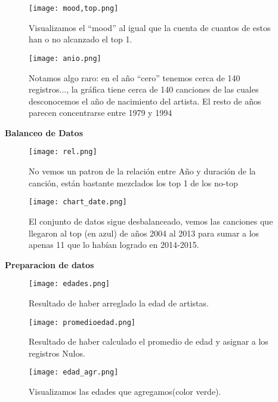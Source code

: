 \documentclass{article}
\begin{document}
\begin{figure}[H]
    \centering
\texttt{[image: mood,top.png]}
    \caption{{\small Visualizamos el ``mood'' al igual que la cuenta de cuantos de estos han o no alcanzado el top 1.}}
    \label{fig:enter-label}
\end{figure}

\begin{figure}[H]
    \centering
\texttt{[image: anio.png]}
    \caption{{\small Notamos algo raro: en el año ``cero'' tenemos cerca de 140 registros..., la gráfica tiene cerca de 140 canciones de las cuales desconocemos el año de nacimiento del artista. El resto de años parecen concentrarse entre 1979 y 1994}}
    \label{fig:enter-label}
\end{figure}


\textbf{Balanceo de Datos}


\begin{figure}[H]
    \centering
\texttt{[image: rel.png]}
    \caption{{\small No vemos un patron de la relación entre Año y duración de la canción, están bastante mezclados los top 1 de los no-top}}
    \label{fig:enter-label}
\end{figure}


\begin{figure}[H]
    \centering
\texttt{[image: chart\_date.png]}
    \caption{{\small El conjunto de datos sigue desbalanceado, vemos las canciones que llegaron al top (en azul) de años 2004 al
    2013 para sumar a los apenas 11 que lo habían logrado en 2014-2015.}}
    \label{fig:enter-label}
\end{figure}



\textbf{Preparacion de datos}

\begin{figure}[H]
    \centering
\texttt{[image: edades.png]}
    \caption{{\small Resultado de haber arreglado la edad de artistas.}}
    \label{fig:enter-label}
\end{figure}

\begin{figure}[H]
    \centering
\texttt{[image: promedioedad.png]}
    \caption{{\small Resultado de haber calculado el promedio de edad y asignar a los registros Nulos.}}
    \label{fig:enter-label}
\end{figure}

\begin{figure}[H]
    \centering
\texttt{[image: edad\_agr.png]}
    \caption{{\small Visualizamos las edades que agregamos(color verde).}}
    \label{fig:enter-label}
\end{figure}
\end{document}
